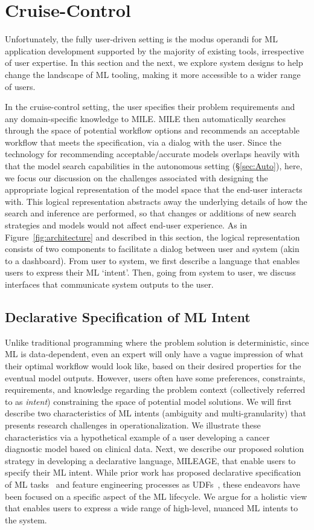 \documentclass[11pt,dvipdfmx]{article}
\newcommand{\system}{{\sf MILE}\xspace}
\newcommand{\systemLang}{{\sf MILEAGE}\xspace}
\begin{document}
\section{Cruise-Control}
\label{sec:Mixed}
Unfortunately, the fully user-driven setting is the modus operandi for ML application development supported by the majority of existing tools, irrespective of user expertise. 
In this section and the next, we explore system designs to help change the landscape of ML tooling, making it more accessible to a wider range of users.

In the cruise-control setting, the user specifies their problem requirements and any domain-specific knowledge to \system. \system then automatically searches through the space of potential workflow options and recommends an acceptable workflow that meets the specification, via a dialog with the user.  Since the technology for recommending acceptable/accurate models overlaps heavily with that the model search capabilities in the autonomous setting (\S\ref{sec:Auto}), here, we focus our discussion on the challenges associated with designing the appropriate logical representation of the model space that the end-user interacts with. This logical representation abstracts away the underlying details of how the search and inference are performed, so that changes or additions of new search strategies and models would not affect end-user experience. As  in Figure~\ref{fig:architecture} and described in this section, the logical representation consists of two components to facilitate a dialog between  user and  system (akin to a dashboard). From user to system, we first describe a language that enables users to express their ML `intent'. Then, going from system to user, we discuss interfaces that communicate system outputs to the user.
\subsection{Declarative Specification of ML Intent}
Unlike traditional programming where the problem solution is deterministic, since ML is data-dependent, even an expert will only have a vague impression of what their optimal workflow would look like, based on their desired properties for the eventual model outputs. However, users often have some preferences, constraints, requirements,  and knowledge regarding the problem context (collectively referred to as \emph{intent}) constraining the space of potential model solutions. We will first describe two characteristics of ML intents (ambiguity and multi-granularity) that presents research challenges in operationalization. We illustrate these characteristics via a hypothetical example of a user developing a cancer diagnostic model based on clinical data. Next, we describe our proposed solution strategy in developing a declarative language, \systemLang, that enable users to specify their ML intent. While prior work has proposed declarative specification of ML tasks~\cite{kraska2013mlbase} and feature engineering processes as UDFs~\cite{Anderson2013}, these endeavors have been focused on a specific aspect of the ML lifecycle. We argue for a holistic view that enables users to express a wide range of high-level, nuanced ML intents to the system.
\end{document}
